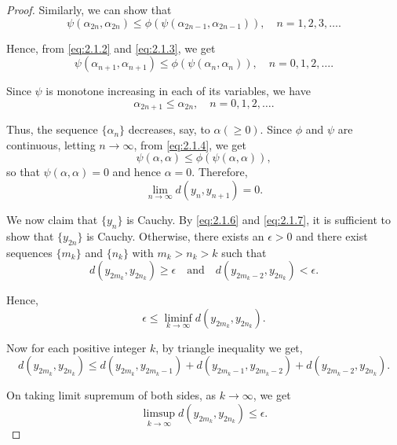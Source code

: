 \documentclass[10pt,a4paper]{amsart}
\begin{document}
\begin{proof}
Similarly, we can show that
\begin{equation}\label{eq:2.1.3}
\psi(\alpha_{2n}, \alpha_{2n}) \leq \phi(\psi(\alpha_{2n-1}, \alpha_{2n-1})), \quad n = 1, 2, 3, \dotsc.
\end{equation}

Hence, from \eqref{eq:2.1.2} and \eqref{eq:2.1.3}, we get
\begin{equation}\label{eq:2.1.4}
\psi(\alpha_{n+1}, \alpha_{n+1}) \leq \phi(\psi(\alpha_{n}, \alpha_{n})), \quad n = 0, 1, 2, \dotsc.
\end{equation}

Since $\psi$ is monotone increasing in each of its variables, we have
\begin{equation}\label{eq:2.1.6}
\alpha_{2n+1} \leq \alpha_{2n}, \quad n = 0, 1, 2, \dotsc.
\end{equation}

Thus, the sequence $\{\alpha_n\}$ decreases, say, to $\alpha (\geq 0)$. Since $\phi$ and $\psi$ are continuous, letting $n \to \infty$, from \eqref{eq:2.1.4}, we get
\[
\psi(\alpha, \alpha) \leq \phi(\psi(\alpha, \alpha)),
\]
so that $\psi(\alpha, \alpha) = 0$ and hence $\alpha = 0$. Therefore,
\begin{equation}\label{eq:2.1.7}
\lim_{n\to\infty} d(y_n, y_{n+1}) = 0.
\end{equation}

We now claim that $\{y_n\}$ is Cauchy. By \eqref{eq:2.1.6} and \eqref{eq:2.1.7}, it is sufficient to show that $\{y_{2n}\}$ is Cauchy. Otherwise, there exists an $\epsilon > 0$ and there exist sequences $\{m_k\}$ and $\{n_k\}$ with $m_k > n_k > k$ such that
\begin{equation}\label{eq:2.1.8}
d(y_{2m_k}, y_{2n_k}) \geq \epsilon \quad \text{and} \quad d(y_{2m_k-2}, y_{2n_k}) < \epsilon.
\end{equation}

Hence,
\begin{equation}\label{eq:2.1.9}
\epsilon \leq \liminf_{k\to\infty} d(y_{2m_k}, y_{2n_k}).
\end{equation}

Now for each positive integer $k$, by triangle inequality we get,
\begin{equation*}
d(y_{2m_k}, y_{2n_k}) \leq d(y_{2m_k}, y_{2m_k-1}) + d(y_{2m_k-1}, y_{2m_k-2}) + d(y_{2m_k-2}, y_{2n_k}).
\end{equation*}

On taking limit supremum of both sides, as $k \to \infty$, we get
\begin{equation}\label{eq:2.1.10}
\limsup_{k\to\infty} d(y_{2m_k}, y_{2n_k}) \leq \epsilon.
\end{equation}


\end{proof}
\end{document}
